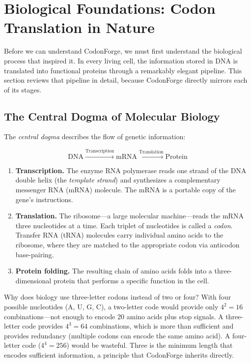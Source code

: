 \section{Biological Foundations: Codon Translation in Nature}
\label{sec:bio-codon-translation}

Before we can understand CodonForge, we must first understand the biological process that inspired it. In every living cell, the information stored in DNA is translated into functional proteins through a remarkably elegant pipeline. This section reviews that pipeline in detail, because CodonForge directly mirrors each of its stages.

\subsection{The Central Dogma of Molecular Biology}

The \emph{central dogma} describes the flow of genetic information:

\begin{equation}
\text{DNA} \xrightarrow{\text{Transcription}} \text{mRNA} \xrightarrow{\text{Translation}} \text{Protein}
\end{equation}

\begin{enumerate}[leftmargin=1.8em]
  \item \textbf{Transcription.} The enzyme RNA polymerase reads one strand of the DNA double helix (the \emph{template strand}) and synthesizes a complementary messenger RNA (mRNA) molecule. The mRNA is a portable copy of the gene's instructions.
  \item \textbf{Translation.} The ribosome---a large molecular machine---reads the mRNA three nucleotides at a time. Each triplet of nucleotides is called a \emph{codon}. Transfer RNA (tRNA) molecules carry individual amino acids to the ribosome, where they are matched to the appropriate codon via anticodon base-pairing.
  \item \textbf{Protein folding.} The resulting chain of amino acids folds into a three-dimensional protein that performs a specific function in the cell.
\end{enumerate}

\begin{bioinsight}
Why does biology use three-letter codons instead of two or four? With four possible nucleotides (A, U, G, C), a two-letter code would provide only $4^2 = 16$ combinations---not enough to encode 20 amino acids plus stop signals. A three-letter code provides $4^3 = 64$ combinations, which is more than sufficient and provides redundancy (multiple codons can encode the same amino acid). A four-letter code ($4^4 = 256$) would be wasteful. Three is the minimum length that encodes sufficient information, a principle that CodonForge inherits directly.
\end{bioinsight}

